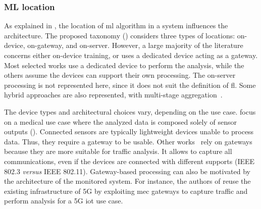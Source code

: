 
\subsubsection{ML location}
\label{sec:sota.quali.location}

As explained in , the location of \gls{ml} algorithm in a system influences the architecture.
The proposed taxonomy () considers three types of locations: on-device, on-gateway, and on-server.
However, a large majority of the literature concerns either on-device training, or uses a dedicated device acting as a gateway.
Most selected works use a dedicated device to perform the analysis, while the others assume the devices can support their own processing.
The on-server processing is not represented here, since it does not suit the definition of \gls{fl}.
Some hybrid approaches are also represented, with multi-stage aggregation~\cite{liu_BlockchainFederatedLearning_2021}.

The device types and architectural choices vary, depending on the use case.
\textcite{zhang_BlockchainbasedFederatedLearning_2020} focus on a medical use case where the analyzed data is composed solely of sensor outputs ().
Connected sensors are typically lightweight devices unable to process data.
Thus, they require a gateway to be usable.
Other works~\cite{li_DeepFedFederatedDeep_2020,chen_Networkanomalydetection_2020,schneble_Attackdetectionusing_2019,zhao_MultiTaskNetworkAnomaly_2019,Popoola2021,al-athbaal-marri_FederatedMimicLearning_2020, kim_CollaborativeAnomalyDetection_2020,chen_Networkanomalydetection_2020,li_DeepFedFederatedDeep_2020b} rely on gateways because they are more suitable for traffic analysis.
It allows to capture all communications, even if the devices are connected with different supports (\eg IEEE 802.3 \emph{versus} IEEE 802.11).
Gateway-based processing can also be motivated by the architecture of the monitored system.
For instance, the authors of \cite{fan_IoTDefenderFederatedTransfer_2020} reuse the existing infrastructure of 5G by exploiting \gls{mec} gateways to capture traffic and perform analysis for a 5G \gls{iot} use case.


